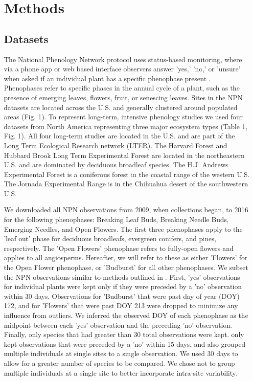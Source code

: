 \documentclass[fleqn,12pt,lineno]{article}
\begin{document}
\section*{Methods}

\subsection*{Datasets}

The National Phenology Network protocol uses status-based monitoring, where via a phone app or web based interface observers answer 'yes,' 'no,' or 'unsure' when asked if an individual plant has a specific phenophase present \citep{denny2014}. Phenophases refer to specific phases in the annual cycle of a plant, such as the presence of emerging leaves, flowers, fruit, or senescing leaves. Sites in the NPN datasets are located across the U.S. and generally clustered around populated areas (Fig. 1). To represent long-term, intensive phenology studies we used four datasets from North America representing three major ecosystem types (Table 1, Fig. 1). All four long-term studies are located in the U.S. and are part of the Long Term Ecological Research network (LTER). The Harvard Forest and Hubbard Brook Long Term Experimental Forest are located in the northeastern U.S. and are dominated by deciduous broadleaf species. The H.J. Andrews Experimental Forest is a coniferous forest in the coastal range of the western U.S. The Jornada Experimental Range is in the Chihuahua desert of the southwestern U.S. 

We downloaded all NPN observations from 2009, when collections began, to 2016 for the following phenophases: Breaking Leaf Buds, Breaking Needle Buds, Emerging Needles, and Open Flowers. The first three phenophases apply to the 'leaf out' phase for deciduous broadleafs, evergreen conifers, and pines, respectively. The 'Open Flowers' phenophase refers to fully-open flowers and applies to all angiosperms. Hereafter, we will refer to these as either 'Flowers' for the Open Flower phenophase, or 'Budburst' for all other phenophases. We subset the NPN observations similar to methods outlined in \cite{crimmins2017}. First, 'yes' observations for individual plants were kept only if they were preceded by a 'no' observation within 30 days. Observations for 'Budburst' that were past day of year (DOY) 172, and for 'Flowers' that were past DOY 213 were dropped to minimize any influence from outliers. We inferred the observed DOY of each phenophase as the midpoint between each 'yes' observation and the preceding 'no' observation. Finally, only species that had greater than 30 total observations were kept. \cite{crimmins2017} only kept observations that were preceded by a 'no' within 15 days, and also grouped multiple individuals at single sites to a single observation. We used 30 days to allow for a greater number of species to be compared. We chose not to group multiple individuals at a single site to better incorporate intra-site variability.
\end{document}
